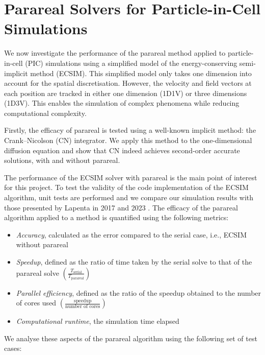 \chapter{Parareal Solvers for Particle-in-Cell Simulations}
\label{cha: methods and results}


We now investigate the performance of the parareal method applied to particle-in-cell (PIC) simulations using a simplified model of the energy-conserving semi-implicit method (ECSIM). This simplified model only takes one dimension into account for the spatial discretisation. However, the velocity and field vectors at each position are tracked in either one dimension (1D1V) or three dimensions (1D3V). This enables the simulation of complex phenomena while reducing computational complexity.

Firstly, the efficacy of parareal is tested using a well-known implicit method: the Crank--Nicolson (CN) integrator. We apply this method to the one-dimensional diffusion equation and show that CN indeed achieves second-order accurate solutions, with and without parareal.

The performance of the ECSIM solver with parareal is the main point of interest for this project. To test the validity of the code implementation of the ECSIM algorithm, unit tests are performed and we compare our simulation results with those presented by Lapenta in 2017 and 2023 \cite{lapenta_exactly_2017,lapenta_advances_2023}. 
 The efficacy of the parareal algorithm applied to a method is quantified using the following metrics:
 \begin{itemize}
    
    \item \textit{Accuracy}, calculated as the error compared to the serial case, i.e., ECSIM without parareal
    
    \item \textit{Speedup}, defined as the ratio of time taken by the serial solve to that of the parareal solve $\left(\frac{T_\mathrm{serial}}{T_\mathrm{parareal}}\right)$
    
    \item \textit{Parallel efficiency}, defined as the ratio of the speedup obtained to the number of cores used $\left(\frac{\text{speedup}}{\text{number of cores}}\right)$
    
    \item \textit{Computational runtime}, the simulation time elapsed
 
 \end{itemize}
We analyse these aspects of the parareal algorithm using the following set of test cases:

